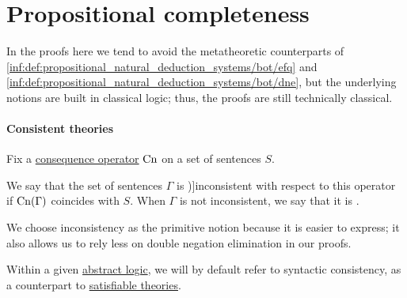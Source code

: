 \section{Propositional completeness}\label{sec:propositional_completeness}

\begin{remark}\label{rem:classical_metatheoretic_proofs}
  In the proofs here we tend to avoid the metatheoretic counterparts of \ref{inf:def:propositional_natural_deduction_systems/bot/efq} and \ref{inf:def:propositional_natural_deduction_systems/bot/dne}, but the underlying notions are built in classical logic; thus, the proofs are still technically classical.
\end{remark}

\paragraph{Consistent theories}

\begin{definition}\label{def:consistent_set_of_sentences}
  Fix a \hyperref[def:consequence_operator]{consequence operator} \( \op{Cn} \) on a set of sentences \( S \).

  We say that the set of sentences \( \Gamma \) is \term[ru=противоречивое (множество формул) (\cite[def. 1.3.15]{Герасимов2011Вычислимость})]{inconsistent} with respect to this operator if \( \op{Cn}(\Gamma) \) coincides with \( S \). When \( \Gamma \) is not inconsistent, we say that it is .
\end{definition}
\begin{comments}
  \item We choose inconsistency as the primitive notion because it is easier to express; it also allows us to rely less on double negation elimination in our proofs.
  \item Within a given \hyperref[def:abstract_logic]{abstract logic}, we will by default refer to syntactic consistency, as a counterpart to \hyperref[def:satisfiable_set_of_sentences]{satisfiable theories}.
\end{comments}

